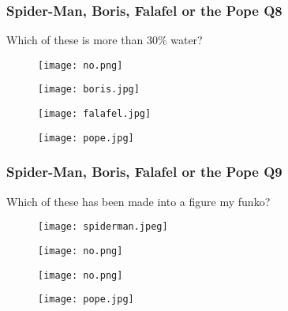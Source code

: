 \documentclass{beamer}
\begin{document}
\begin{frame}
\frametitle{Spider-Man, Boris, Falafel or the Pope Q8}
Which of these is more than 30\% water?
\begin{figure}[!htb]
    \centering
    \begin{minipage}{.5\textwidth}
        \centering
        \texttt{[image: no.png]}
        
    \end{minipage}%
    \begin{minipage}{0.5\textwidth}
        \centering
        \texttt{[image: boris.jpg]}
        
    \end{minipage}
\end{figure}
\begin{figure}[!htb]
    \centering
    \begin{minipage}{.5\textwidth}
        \centering
        \texttt{[image: falafel.jpg]}
        
    \end{minipage}%
    \begin{minipage}{0.5\textwidth}
        \centering
        \texttt{[image: pope.jpg]}
        
    \end{minipage}
\end{figure}
\end{frame}




\begin{frame}
\frametitle{Spider-Man, Boris, Falafel or the Pope Q9}
Which of these has been made into a figure my funko?
\begin{figure}[!htb]
    \centering
    \begin{minipage}{.5\textwidth}
        \centering
        \texttt{[image: spiderman.jpeg]}
        
    \end{minipage}%
    \begin{minipage}{0.5\textwidth}
        \centering
        \texttt{[image: no.png]}
        
    \end{minipage}
\end{figure}
\begin{figure}[!htb]
    \centering
    \begin{minipage}{.5\textwidth}
        \centering
        \texttt{[image: no.png]}
        
    \end{minipage}%
    \begin{minipage}{0.5\textwidth}
        \centering
        \texttt{[image: pope.jpg]}
        
    \end{minipage}
\end{figure}
\end{frame}
\end{document}
